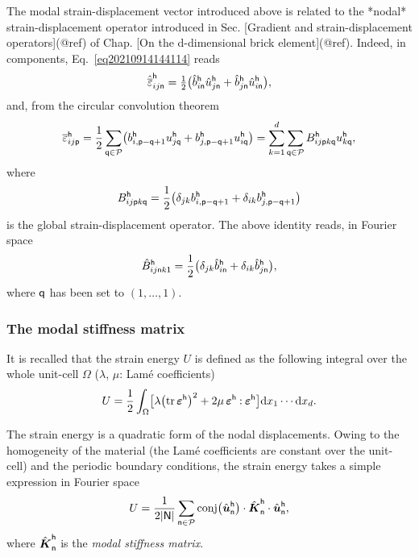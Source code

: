 The modal strain-displacement vector introduced above is related to the *nodal*
strain-displacement operator introduced in Sec. [Gradient and
strain-displacement operators](@ref) of Chap. [On the d-dimensional brick
element](@ref). Indeed, in components, Eq. \eqref{eq20210914144114} reads
\begin{equation}
  \hat{\overline{\varepsilon}}_{ij\mathsf{n}}^\mathsf{h}
  =\tfrac12\bigl(\hat{b}_{i\mathsf{n}}^\mathsf{h}\hat{u}_{j\mathsf{n}}^\mathsf{h}
  +\hat{b}_{j\mathsf{n}}^\mathsf{h}\hat{u}_{i\mathsf{n}}^\mathsf{h}\bigr),
\end{equation}
and, from the circular convolution theorem
\begin{equation}
  \overline{\varepsilon}_{ij\mathsf{p}}^\mathsf{h}
  =\frac12\sum_{\mathsf{q}\in\mathcal{P}}\bigl(
  b_{i,\mathsf{p}-\mathsf{q}+1}^\mathsf{h}u_{j\mathsf{q}}^\mathsf{h}
  +b_{j,\mathsf{p}-\mathsf{q}+1}^\mathsf{h}u_{i\mathsf{q}}^\mathsf{h}\bigr)
  =\sum_{k=1}^d\sum_{\mathsf{q}\in\mathcal{P}}B_{ij\mathsf{p}k\mathsf{q}}^\mathsf{h}
  u_{k\mathsf{q}}^\mathsf{h},
\end{equation}
where
\begin{equation}
  B_{ij\mathsf{p}k\mathsf{q}}^\mathsf{h}
  =\frac12\bigl(\delta_{jk}b_{i,\mathsf{p}-\mathsf{q}+1}^\mathsf{h}
  +\delta_{ik}b_{j,\mathsf{p}-\mathsf{q}+1}^\mathsf{h}\bigr)
\end{equation}
is the global strain-displacement operator. The above identity reads, in Fourier
space
\begin{equation}
  \hat{B}_{ij\mathsf{n}k\mathsf{1}}^\mathsf{h}
  =\frac12\bigl(\delta_{jk}\hat{b}_{i\mathsf{n}}^\mathsf{h}
  +\delta_{ik}\hat{b}_{j\mathsf{n}}^\mathsf{h}\bigr),
\end{equation}
where \(\mathsf{q}\) has been set to \((1, \ldots, 1)\).

\subsubsection{The modal stiffness matrix}

It is recalled that the strain energy \(U\) is defined as the following integral
over the whole unit-cell \(\Omega\) (\(\lambda\), \(\mu\): Lamé coefficients)
\begin{equation}
  U=\frac12\int_\Omega\bigl[\lambda\bigl(\operatorname{tr}\boldsymbol\varepsilon^\mathsf{h}\bigr)^2
  +2\mu\,\boldsymbol\varepsilon^\mathsf{h}\mathbin{\mathord{:}}\boldsymbol\varepsilon^\mathsf{h}\bigr]
  \mathrm d x_1\cdots\mathrm d x_d.
\end{equation}

The strain energy is a quadratic form of the nodal displacements. Owing to the
homogeneity of the material (the Lamé coefficients are constant over the
unit-cell) and the periodic boundary conditions, the strain energy takes a
simple expression in Fourier space
\begin{equation}
  \label{eq:20210914060318}
  U=\frac 1{2\lvert\mathsf{N}\rvert}
  \sum_{\mathsf{n}\in\mathcal{P}}
  \operatorname{conj}\bigl(\hat{\boldsymbol u}_\mathsf{n}^\mathsf{h}\bigr)
  \cdot\hat{\boldsymbol K}_\mathsf{n}^\mathsf{h}
  \cdot\hat{\boldsymbol u}_\mathsf{n}^\mathsf{h},
\end{equation}
where \(\hat{\boldsymbol K}_\mathsf{n}^\mathsf{h}\) is the \emph{modal stiffness matrix}.

